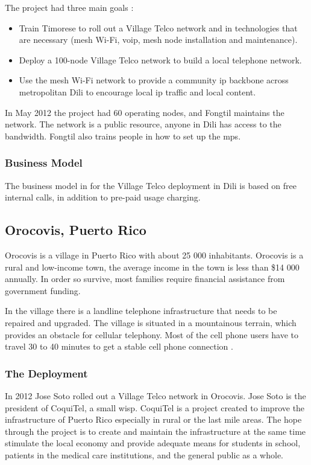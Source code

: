 The project had three main goals \cite{vtdili}:
\begin{itemize}
\item Train Timorese to roll out a Village Telco network and in technologies that are necessary (mesh Wi-Fi, \gls{voip}, mesh node installation and maintenance).
\item Deploy a 100-node Village Telco network to build a local telephone network.
\item Use the mesh Wi-Fi network to provide a community \gls{ip} backbone across metropolitan Dili to encourage local \gls{ip} traffic and local content.
\end{itemize}

In May 2012 the project had 60 operating nodes, and Fongtil maintains the network. The network is a public resource, anyone in Dili has access to the bandwidth. Fongtil also trains people in how to set up the \glspl{mp}. 


\subsubsection{Business Model}
The business model in for the Village Telco deployment in Dili is based on free internal calls, in addition to pre-paid usage charging.  

\subsection{Orocovis, Puerto Rico}
Orocovis is a village in Puerto Rico with about 25 000 inhabitants. Orocovis is a rural and low-income town, the average income in the town is less than \$14 000 annually. In order so survive, most families require financial assistance from government funding.   

In the village there is a landline telephone infrastructure that needs to be repaired and upgraded. The village is situated in a mountainous terrain, which provides an obstacle for cellular telephony. Most of the cell phone users have to travel 30 to 40 minutes to get a stable cell phone connection \cite{vtpuertorico, soto}. 

\subsubsection{The Deployment}
In 2012 Jose Soto rolled out a Village Telco network in Orocovis. Jose Soto is the president of CoquiTel, a small \gls{wisp}. CoquiTel is a project created to improve the infrastructure of Puerto Rico especially in rural or the last mile areas. The hope through the project is to create and maintain the infrastructure at the same time stimulate the local economy and provide adequate means for students in school, patients in the medical care institutions, and the general public as a whole.  

